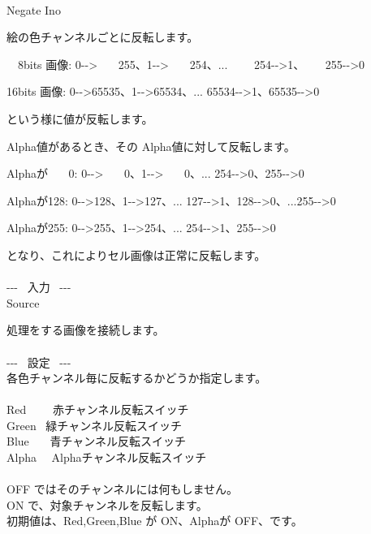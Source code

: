 \documentclass[a4paper,12pt]{article}
\begin{document}
\thispagestyle{empty}

\Large
\noindent \\
Negate Ino\medskip
\par
\normalsize
絵の色チャンネルごとに反転します。\\
\par
\ \ 8bits 画像: 0-{-}> \ \ \ 255、1-{-}> \ \ \, 254、... \ \ \ \ 254-{-}>1、 \ \ \, 255-{-}>0\par
16bits 画像: 0-{-}>65535、1-{-}>65534、... 65534-{-}>1、65535-{-}>0\par
という様に値が反転します。\\
\par
Alpha値があるとき、その Alpha値に対して反転します。\par
Alphaが \ \ \ 0: 0-{-}> \ \ \, 0、1-{-}> \ \ \ 0、... 254-{-}>0、255-{-}>0\par
Alphaが128: 0-{-}>128、1-{-}>127、... 127-{-}>1、128-{-}>0、...255-{-}>0\par
Alphaが255: 0-{-}>255、1-{-}>254、... 254-{-}>1、255-{-}>0\par
となり、これによりセル画像は正常に反転します。\\
\\
-{-}- \ 入力 \ -{-}-\\
Source\par
処理をする画像を接続します。\\
\\
-{-}- \ 設定 \ -{-}-\\
各色チャンネル毎に反転するかどうか指定します。\\
\\
Red \ \ \ \, 赤チャンネル反転スイッチ\\
Green \ 緑チャンネル反転スイッチ\\
Blue \ \ \, 青チャンネル反転スイッチ\\
Alpha \ \ Alphaチャンネル反転スイッチ\\
\\
OFF ではそのチャンネルには何もしません。\\
ON で、対象チャンネルを反転します。\\
初期値は、Red,Green,Blue が ON、Alphaが OFF、です。
\end{document}
